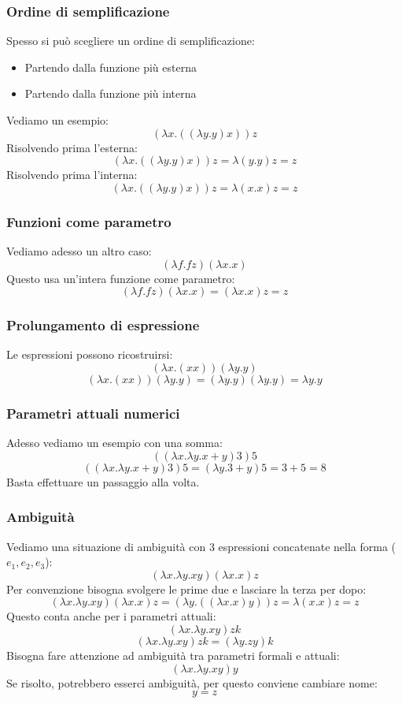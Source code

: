 \documentclass[12pt,a4paper]{article}
\begin{document}
\subsubsection{Ordine di semplificazione}
Spesso si può scegliere un ordine di semplificazione:
\begin{itemize}
  \item Partendo dalla funzione più esterna
  \item Partendo dalla funzione più interna
\end{itemize}
Vediamo un esempio:
\[
(\lambda x.((\lambda y.y)x))z
\]
Risolvendo prima l'esterna:
\[
(\lambda x.((\lambda y.y)x))z = \lambda(y.y)z = z
\]
Risolvendo prima l'interna:
\[
(\lambda x.((\lambda y.y)x))z = \lambda(x.x)z = z
\]
\subsubsection{Funzioni come parametro}
Vediamo adesso un altro caso:
\[
(\lambda f.fz)(\lambda x.x)
\]
Questo usa un'intera funzione come parametro:
\[
(\lambda f.fz)(\lambda x.x) = (\lambda x.x)z = z
\]
\subsubsection{Prolungamento di espressione}
Le espressioni possono ricostruirsi:
\[
(\lambda x.(xx))(\lambda y.y)
\]
\[
(\lambda x.(xx))(\lambda y.y) = (\lambda y.y)(\lambda y.y) = \lambda y.y
\]
\subsubsection{Parametri attuali numerici}
Adesso vediamo un esempio con una somma:
\[
((\lambda x.\lambda y.x+y)3)5
\]
\[
((\lambda x.\lambda y.x+y)3)5 = (\lambda y.3+y)5 = 3+5 = 8
\]
Basta effettuare un passaggio alla volta.
\subsubsection{Ambiguità}
Vediamo una situazione di ambiguità con 3 espressioni concatenate nella forma ($e_1, e_2, e_3$):
\[
(\lambda x.\lambda y.xy)(\lambda x.x)z
\]
Per convenzione bisogna svolgere le prime due e lasciare la terza per dopo:
\[
(\lambda x.\lambda y.xy)(\lambda x.x)z = (\lambda y.((\lambda x.x)y))z = \lambda(x.x)z = z
\]
Questo conta anche per i parametri attuali:
\[
(\lambda x. \lambda y.xy)zk
\]
\[
(\lambda x. \lambda y.xy)zk = (\lambda y.zy)k
\]
Bisogna fare attenzione ad ambiguità tra parametri formali e attuali:
\[
(\lambda x. \lambda y.xy)y
\]
Se risolto, potrebbero esserci ambiguità, per questo conviene cambiare nome:
\[
y = z
\]
\end{document}
